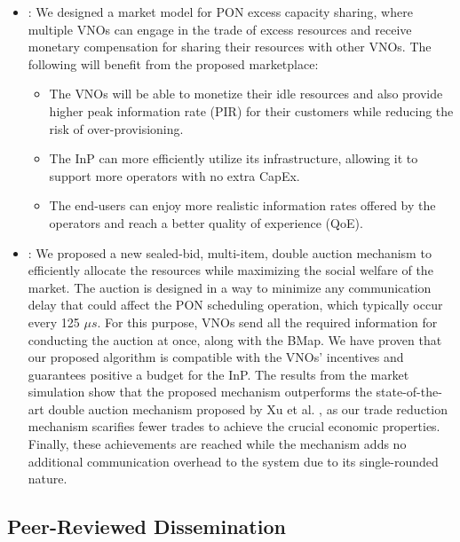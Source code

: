 \begin{itemize}
    \item \textit{\RQc}: We designed a market model for \ac{PON} excess capacity sharing, where multiple \acp{VNO} can engage in the trade of excess resources and receive monetary compensation for sharing their resources with other \acp{VNO}. The following will benefit from the proposed marketplace:
    \begin{itemize}
    \item The \acp{VNO} will be able to monetize their idle resources and also provide higher peak information rate (PIR) for their customers while reducing the risk of over-provisioning. %
    \item The \ac{InP} can more efficiently utilize its infrastructure, allowing it to support more operators with no extra \ac{CapEx}.
    \item The end-users can enjoy more realistic information rates offered by the operators and reach a better quality of experience (QoE).
    \end{itemize} 
    
     \item \textit{\RQd}: We proposed a new sealed-bid, multi-item, double auction mechanism to efficiently allocate the resources while maximizing the social welfare of the market. The auction is designed in a way to minimize any communication delay that could affect the \ac{PON} scheduling operation, which typically occur every 125 $\mu s$. For this purpose, \acp{VNO} send all the required information for conducting the auction at once, along with the \ac{BMap}. We have proven that our proposed algorithm is compatible with the \acp{VNO}' incentives and guarantees positive a budget for the \ac{InP}. The results from the market simulation show that the proposed mechanism outperforms the state-of-the-art double auction mechanism proposed by Xu et al. \cite{5462277}, as our trade reduction mechanism scarifies fewer trades to achieve the crucial economic properties. Finally, these achievements are reached while the mechanism adds no additional communication overhead to the system due to its single-rounded nature.
\end{itemize}





\subsection{Peer-Reviewed Dissemination}

